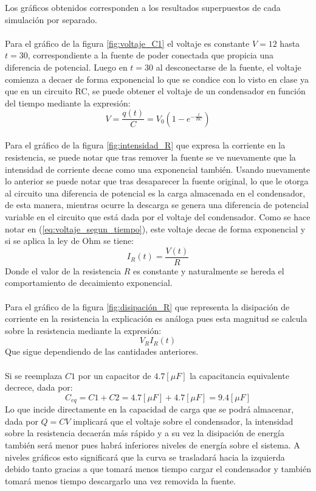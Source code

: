 \documentclass[letterpaper,11pt]{article} %
\begin{document}
Los gráficos obtenidos corresponden a los resultados superpuestos de cada simulación por separado.\\\\Para el gráfico de la figura \ref{fig:voltaje_C1} el voltaje es constante $V=12$ hasta $t=30$, correspondiente a la fuente de poder conectada que propicia una diferencia de potencial. Luego en $t=30$ al desconectarse de la fuente, el voltaje comienza a decaer de forma exponencial lo que se condice con lo visto en clase ya que en un circuito RC, se puede obtener el voltaje de un condensador en función del tiempo mediante la expresión:
\begin{equation}
V = \frac{q(t)}{C} = V_0(1 - e^{-\frac{t}{RC}}) \label{eq:voltaje_segun_tiempo}   
\end{equation}
\\
Para el gráfico de la figura \ref{fig:intensidad_R} que expresa la corriente en la resistencia, se puede notar que tras remover la fuente se ve nuevamente que la intensidad de corriente decae como una exponencial también. Usando nuevamente lo anterior se puede notar que tras desaparecer la fuente original, lo que le otorga al circuito una diferencia de potencial es la carga almacenada en el condensador, de esta manera, mientras ocurre la descarga se genera una diferencia de potencial variable en el circuito que está dada por el voltaje del condensador. Como se hace notar en (\ref{eq:voltaje_segun_tiempo}), este voltaje decae de forma exponencial y si se aplica la ley de Ohm se tiene:
$$ I_{R}(t) = \frac{V(t)}{R} $$
Donde el valor de la resistencia $R$ es constante y naturalmente se hereda el comportamiento de decaimiento exponencial.
\\\\
Para el gráfico de la figura \ref{fig:disipación_R} que representa la disipación de corriente en la resistencia la explicación es análoga pues esta magnitud se calcula sobre la resistencia mediante la expresión:
$$ V_{R}I_{R}(t) $$
Que sigue dependiendo de las cantidades anteriores.
\\\\
Si se reemplaza $C1$ por un capacitor de $4.7 [\mu F]$ la capacitancia equivalente decrece, dada por:
$$ C_{eq} = C1 + C2 = 4.7[\mu F] + 4.7[\mu F] = 9.4 [\mu F] $$
Lo que incide directamente en la capacidad de carga que se podrá almacenar, dada por $Q = CV$ implicará que el voltaje sobre el condensador, la intensidad sobre la resistencia decaerán más rápido y a su vez la disipación de energía también será menor pues habrá inferiores niveles de energía sobre el sistema. A niveles gráficos esto significará que la curva se trasladará hacia la izquierda debido tanto gracias a que tomará menos tiempo cargar el condensador y también tomará menos tiempo descargarlo una vez removida la fuente. 
\newpage
\end{document}
